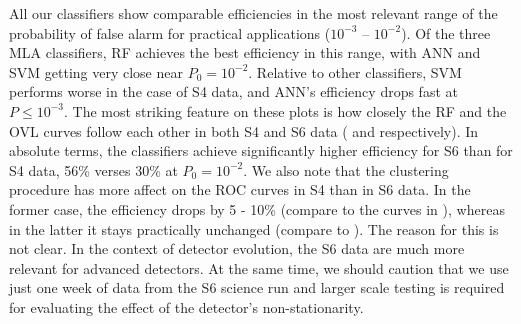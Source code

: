\documentclass[prd, twocolumn, lengthcheck, superscriptaddress, showpacs, letterpaper, nofootinbib]{revtex4-1}
\begin{document}
All our classifiers show comparable efficiencies in the most relevant range of the probability of false alarm for practical applications ($10^{-3}$ -- $10^{-2}$). Of the three \ac{MLA} classifiers, \ac{RF} achieves the best efficiency in this range, with \ac{ANN} and \ac{SVM} getting very close near $P_{0} =10^{-2}$. Relative to other classifiers, \ac{SVM} performs worse in the case of S4 data, and \ac{ANN}'s efficiency drops fast at $P \le 10^{-3}$. The most striking feature on these plots is how closely the \ac{RF} and the \ac{OVL} curves follow each other in both S4 and S6 data ( and  respectively). In absolute terms, the classifiers achieve significantly higher efficiency for S6 than for S4 data, 56\% verses 30\% at $P_{0} = 10^{-2}$. We also note that the clustering procedure has more affect on the \ac{ROC} curves in S4 than in S6 data. In the former case, the efficiency drops by 5 - 10\% (compare to the curves in  ), whereas in the latter it stays practically unchanged (compare to ). The reason for this is not clear. In the context of detector evolution, the S6 data are much more relevant for advanced detectors. At the same time, we should caution that we use just one week of data from the S6 science run and larger scale testing is required for evaluating the effect of the detector's non-stationarity.    
\end{document}
